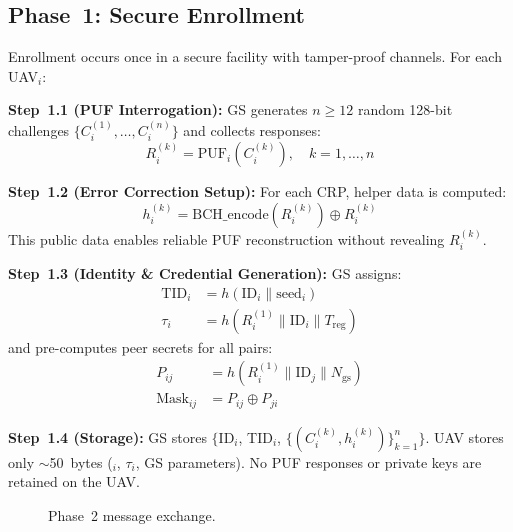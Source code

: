 \documentclass[conference]{IEEEtran}
\begin{document}
\subsection{Phase~1: Secure Enrollment}
Enrollment occurs once in a secure facility with tamper-proof channels. For each UAV$_i$:

\textbf{Step~1.1 (PUF Interrogation):} GS generates $n \geq 12$ random 128-bit challenges $\{C_i^{(1)}, \ldots, C_i^{(n)}\}$ and collects responses:
\begin{equation}
R_i^{(k)} = \text{PUF}_i(C_i^{(k)}), \quad k = 1, \ldots, n
\label{eq:puf_eval}
\end{equation}

\textbf{Step~1.2 (Error Correction Setup):} For each CRP, helper data is computed:
\begin{equation}
h_i^{(k)} = \text{BCH\_encode}(R_i^{(k)}) \oplus R_i^{(k)}
\label{eq:helper}
\end{equation}
This public data enables reliable PUF reconstruction without revealing $R_i^{(k)}$.

\textbf{Step~1.3 (Identity \& Credential Generation):} GS assigns:
\begin{align}
\text{TID}_i &= h(\text{ID}_i \| \text{seed}_i) \label{eq:tid}\\
\tau_i &= h(R_i^{(1)} \| \text{ID}_i \| T_{\text{reg}}) \label{eq:token}
\end{align}
and pre-computes peer secrets for all pairs:
\begin{align}
P_{ij} &= h(R_i^{(1)} \| \text{ID}_j \| N_{\text{gs}}) \label{eq:peer_secret}\\
\text{Mask}_{ij} &= P_{ij} \oplus P_{ji} \label{eq:mask}
\end{align}

\textbf{Step~1.4 (Storage):} GS stores $\{$ID$_i$, TID$_i$, $\{(C_i^{(k)}, h_i^{(k)})\}_{k=1}^{n}\}$. UAV stores only $\sim$50~bytes ($_i$, $\tau_i$, GS parameters). No PUF responses or private keys are retained on the UAV.

\begin{figure}[H]
\centering
{}
\caption{Phase~2 message exchange.}
\label{fig:phase2}
\end{figure}
\end{document}
